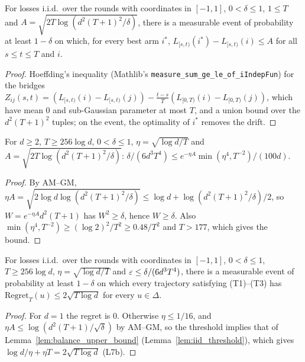 \begin{lemma}
  \label{lem:iid_balanced}
  \leanok
  For losses i.i.d.\ over the rounds with coordinates in $[-1, 1]$, $0 < \delta \le 1$, $1 \le T$
  and $A = \sqrt{2T\log(d^2(T+1)^2/\delta)}$, there is a measurable event of probability at least
  $1 - \delta$ on which, for every best arm $i^*$, $L_{[s,t)}(i^*) - L_{[s,t)}(i) \le A$ for all
  $s \le t \le T$ and $i$.
\end{lemma}

\begin{proof}
  \leanok
  Hoeffding's inequality (Mathlib's \texttt{measure\_sum\_ge\_le\_of\_iIndepFun}) for the bridges
  $Z_{ij}(s, t) = (L_{[s,t)}(i) - L_{[s,t)}(j)) - \frac{t - s}{T}(L_{[0,T)}(i) - L_{[0,T)}(j))$,
  which have mean $0$ and sub-Gaussian parameter at most $T$, and a union bound over the
  $d^2(T+1)^2$ tuples; on the event, the optimality of $i^*$ removes the drift.
\end{proof}

\begin{lemma}
  \label{lem:iid_threshold}
  \leanok
  For $d \ge 2$, $T \ge 256\log d$, $0 < \delta \le 1$, $\eta = \sqrt{\log d / T}$ and
  $A = \sqrt{2T\log(d^2(T+1)^2/\delta)}$:
  $\delta/(6d^3T^4) \le e^{-\eta A}\min(\eta^4, T^{-2})/(100d)$.
\end{lemma}

\begin{proof}
  \leanok
  By AM--GM, $\eta A = \sqrt{2\log d\log(d^2(T+1)^2/\delta)}
  \le \log d + \log(d^2(T+1)^2/\delta)/2$, so $W = e^{-\eta A}d^2(T+1)$ has $W^2 \ge \delta$, hence $W \ge \delta$. Also
  $\min(\eta^4, T^{-2}) \ge (\log 2)^2/T^2 \ge 0.48/T^2$ and $T > 177$, which gives the bound.
\end{proof}

\begin{theorem}
  \label{thm:ub_barrier_stochastic}
  \leanok
  For losses i.i.d.\ over the rounds with coordinates in $[-1, 1]$, $0 < \delta \le 1$,
  $T \ge 256 \log d$, $\eta = \sqrt{\log d / T}$ and $\varepsilon \le \delta/(6d^3T^4)$, there is a
  measurable event of probability at least $1 - \delta$ on which every trajectory satisfying
  (T1)--(T3) has $\mathrm{Regret}_T(u) \le 2\sqrt{T\log d}$ for every $u \in \Delta$.
\end{theorem}

\begin{proof}
  \leanok
  For $d = 1$ the regret is $0$. Otherwise $\eta \le 1/16$, and $\eta A \le \log(d^2(T+1)/\sqrt\delta)$
  by AM--GM, so the threshold implies that of Lemma~\ref{lem:balance_upper_bound}
  (Lemma~\ref{lem:iid_threshold}), which gives
  $\log d/\eta + \eta T = 2\sqrt{T\log d}$ (L7b).
\end{proof}
